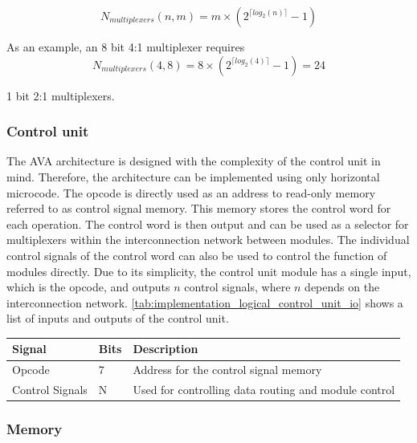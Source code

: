 \begin{displaymath}
    N_{multiplexers}(n, m) = m \times (2^{\lceil log_2(n) \rceil} - 1)
\end{displaymath}

As an example, an 8 bit 4:1 multiplexer requires 
\begin{displaymath}
    N_{multiplexers}(4, 8) = 8 \times (2^{\lceil log_2(4) \rceil} - 1) = 24
\end{displaymath}

1 bit 2:1 multiplexers.


\subsubsection{Control unit}

The AVA architecture is designed with the complexity of the control unit in mind. Therefore, the architecture can be implemented using only horizontal microcode. The opcode is directly used as an address to read-only memory referred to as control signal memory. This memory stores the control word for each operation. The control word is then output and can be used as a selector for multiplexers within the interconnection network between modules. The individual control signals of the control word can also be used to control the function of modules directly. Due to its simplicity, the control unit module has a single input, which is the opcode, and outputs $n$ control signals, where $n$ depends on the interconnection network. \autoref{tab:implementation_logical_control_unit_io} shows a list of inputs and outputs of the control unit.

\begin{table}[H]
    \centering
    \begin{tabular}{|l|l|l|} 
    \hline
    \textbf{\textbf{Signal}} & \textbf{Bits} & \textbf{Description}                                  \\ 
    \hline
    Opcode                   & 7             & Address for the control signal memory                 \\ 
    \hline
    Control Signals          & N             & Used for controlling data routing and module control  \\
    \hline
    \end{tabular}
\end{table}
\caption{Input and output signals of the control unit}
\label{tab:implementation_logical_control_unit_io}

\subsubsection{Memory}

